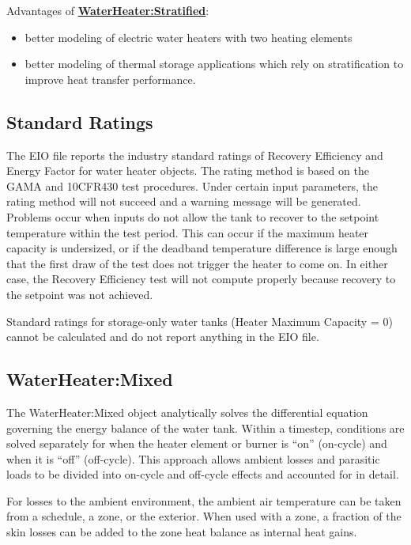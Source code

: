 Advantages of \textbf{\hyperref[waterheaterstratified]{WaterHeater:Stratified}}:

\begin{itemize}
\item
  better modeling of electric water heaters with two heating elements
\item
  better modeling of thermal storage applications which rely on stratification to improve heat transfer performance.
\end{itemize}

\subsection{Standard Ratings}\label{standard-ratings}

The EIO file reports the industry standard ratings of Recovery Efficiency and Energy Factor for water heater objects. The rating method is based on the GAMA and 10CFR430 test procedures. Under certain input parameters, the rating method will not succeed and a warning message will be generated. Problems occur when inputs do not allow the tank to recover to the setpoint temperature within the test period. This can occur if the maximum heater capacity is undersized, or if the deadband temperature difference is large enough that the first draw of the test does not trigger the heater to come on. In either case, the Recovery Efficiency test will not compute properly because recovery to the setpoint was not achieved.

Standard ratings for storage-only water tanks (Heater Maximum Capacity = 0) cannot be calculated and do not report anything in the EIO file.

\subsection{WaterHeater:Mixed}\label{waterheatermixed}

The WaterHeater:Mixed object analytically solves the differential equation governing the energy balance of the water tank. Within a timestep, conditions are solved separately for when the heater element or burner is ``on'' (on-cycle) and when it is ``off'' (off-cycle). This approach allows ambient losses and parasitic loads to be divided into on-cycle and off-cycle effects and accounted for in detail.

For losses to the ambient environment, the ambient air temperature can be taken from a schedule, a zone, or the exterior. When used with a zone, a fraction of the skin losses can be added to the zone heat balance as internal heat gains.


